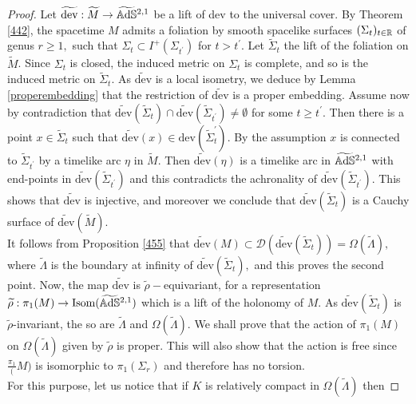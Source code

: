 \begin{proof}
    Let $\widetilde{\text{dev}}:\widetilde{M}\to\widetilde{\mathbb{A}\mathrm{d}\mathbb{S}}{}^{2,1}$ be a lift of dev to the universal cover. By Theorem \ref{442}, the spacetime $M$ admits a foliation by smooth spacelike surfaces $(\Sigma_t)_{t\in\mathbb{R}}$ of genus $r\geq 1,$ such that $\Sigma_t\subset I^+(\Sigma_{t^{\prime}})$ for $t>t^{\prime}$. Let $\widetilde{\Sigma}_t$ the lift of the foliation on $\widetilde{M}$. Since $\Sigma_t$ is closed, the induced metric on $\Sigma_t$ is complete, and so is the induced metric on $\widetilde{\Sigma}_t$. As $\widetilde{\text{dev}}$ is a local isometry, we deduce by Lemma \ref{properembedding} that the restriction of $\widetilde{\text{dev}}$ is a proper embedding. Assume now by contradiction that $\widetilde{\text{dev}}(\widetilde{\Sigma}_t)\cap \widetilde{\text{dev}}(\widetilde{\Sigma}_{t^{\prime}})\neq \emptyset$ for some $t\geq t^{\prime}.$ Then there is a point $x\in \widetilde{\Sigma}_t$ such that $\widetilde{\text{dev}}(x)\in\text{dev}(\widetilde{\Sigma}_t^{\prime}).$ By the assumption $x$ is connected to $\widetilde{\Sigma}_{t^{\prime} }$ by a timelike arc $\eta$ in $\widetilde{M}.$ Then $\widetilde{\text{dev}}(\eta)$ is a timelike arc in $\widetilde{\mathbb{A}\mathrm{d}\mathbb{S}}{}^{2,1}$ with end-points in $\widetilde{\text{dev}}(\widetilde{\Sigma}_{t^{\prime}})$ and this contradicts the achronality of $\widetilde{\text{dev}}(\widetilde{\Sigma}_{t^{\prime} }).$ This shows that $\widetilde{\text{dev}}$ is injective, and moreover we conclude that $\widetilde{\text{dev}}(\widetilde{\Sigma}_t)$ is a Cauchy surface of $\widetilde{\text{dev}}(\widetilde{M})$.\\
    It follows from Proposition \ref{455} that $\widetilde{\text{dev}}(M)\subset \mathcal{D}(\widetilde{\text{dev}}(\widetilde{\Sigma}_t))=\Omega(\widetilde{\Lambda}),$ where $\widetilde{\Lambda}$ is the boundary at infinity of $\widetilde{\text{dev}}(\widetilde{\Sigma}_t),$ and this proves the second point.       
    Now, the map $\widetilde{\text{dev}}$ is $\widetilde{\rho}-$equivariant, for a representation $\widetilde{\rho}:\pi_1(M)\to\text{Isom}(\widetilde{\mathbb{A}\mathrm{d}\mathbb{S}}{}^{2,1})$ which is a lift of the holonomy of $M$. As $\widetilde{\text{dev}}(\widetilde{\Sigma}_t)$ is $\widetilde{\rho}$-invariant, the so are $\widetilde{\Lambda}$ and $\Omega(\widetilde{\Lambda})$. We shall prove that the action of $\pi_1(M)$ on $\Omega(\widetilde{\Lambda})$ given by $\widetilde{\rho}$ is proper. This will also show that the action is free since $\frac{\pi_1}(M)$ is isomorphic to $\pi_1(\Sigma_r)$ and therefore has no torsion. \\
    For this purpose, let us notice that if $K$ is relatively compact in $\Omega(\widetilde{\Lambda})$ then 

\end{proof}
